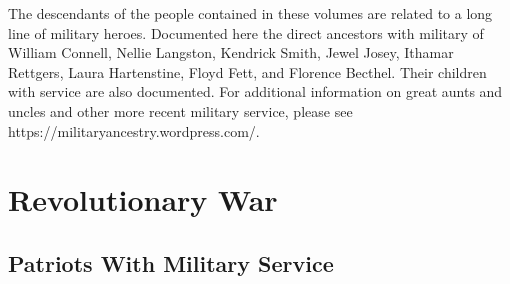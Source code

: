 \documentclass[11pt,letter]{book}
\begin{document}
The descendants of the people contained in these volumes are related to a long line of military heroes.  Documented here the direct ancestors with military of William Connell, Nellie Langston, Kendrick Smith, Jewel Josey, Ithamar Rettgers, Laura Hartenstine, Floyd Fett, and Florence Becthel.  Their children with service are also documented.  For additional information on great aunts and uncles and other more recent military service, please see https://militaryancestry.wordpress.com/.

\chapter{Revolutionary War}

\section{Patriots With Military Service}
\end{document}
